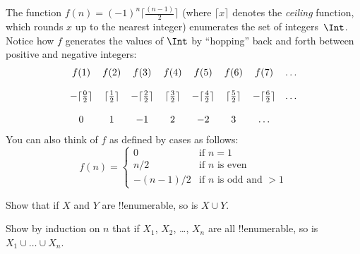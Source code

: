 \documentclass[../../../include/open-logic-section]{subfiles}
\begin{document}
\begin{ex}
The function $f(n) = (-1)^{n} \lceil \frac{(n-1)}{2}\rceil$ (where
$\lceil x \rceil$ denotes the \emph{ceiling} function, which rounds
$x$ up to the nearest integer) enumerates the set of
integers~$\Int$. Notice how $f$ generates the values of $\Int$ by
``hopping'' back and forth between positive and negative integers:
\[
\begin{array}{c c c c c c c c}
f(1) & f(2) & f(3) & f(4) & f(5) & f(6) & f(7) & \dots \\ \\
- \lceil \tfrac{0}{2} \rceil & \lceil \tfrac{1}{2}\rceil & - \lceil \tfrac{2}{2} \rceil & \lceil \tfrac{3}{2} \rceil & - \lceil \tfrac{4}{2} \rceil  & \lceil \tfrac{5}{2}
\rceil & - \lceil \tfrac{6}{2} \rceil & \dots \\ \\
0 & 1 & -1 & 2 & -2 & 3 & \dots
\end{array}
\]
You can also think of $f$ as defined by cases as follows:
\[
f(n) = \begin{cases}
  0 & \text{if $n = 1$}\\
  n/2 & \text{if $n$ is even}\\
  -(n-1)/2 & \text{if $n$ is odd and $>1$}
  \end{cases}
\]
\end{ex}

\begin{prob}
Show that if $X$ and $Y$ are !!{enumerable}, so is $X \cup Y$.
\end{prob}

\begin{prob}
  Show by induction on $n$ that if $X_1$, $X_2$, \dots, $X_n$ are all
  !!{enumerable}, so is $X_1 \cup \dots \cup X_n$.
\end{prob}
\end{document}
